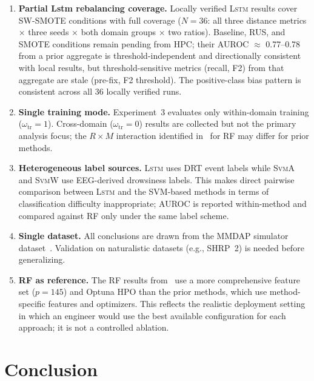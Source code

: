 \documentclass[lettersize,journal]{IEEEtran}
\newcommand{\Impl}[1]{\textsc{#1}}
\begin{document}
\begin{enumerate}
\item \textbf{Partial Lstm rebalancing coverage.} Locally verified \Impl{Lstm} results cover SW-SMOTE conditions with full coverage ($N{=}36$: all three distance metrics $\times$ three seeds $\times$ both domain groups $\times$ two ratios). Baseline, RUS, and SMOTE conditions remain pending from HPC; their AUROC $\approx$ 0.77--0.78 from a prior aggregate is threshold-independent and directionally consistent with local results, but threshold-sensitive metrics (recall, F2) from that aggregate are stale (pre-fix, F2 threshold). The positive-class bias pattern is consistent across all 36 locally verified runs.

\item \textbf{Single training mode.} Experiment~3 evaluates only within-domain training ($\omega_{\mathrm{tr}} = 1$). Cross-domain ($\omega_{\mathrm{tr}} = 0$) results are collected but not the primary analysis focus; the $R \times M$ interaction identified in~\cite{nakagama2026tiv} for RF may differ for prior methods.

\item \textbf{Heterogeneous label sources.} \Impl{Lstm} uses DRT event labels while \Impl{SvmA} and \Impl{SvmW} use EEG-derived drowsiness labels. This makes direct pairwise comparison between \Impl{Lstm} and the SVM-based methods in terms of classification difficulty inappropriate; AUROC is reported within-method and compared against RF only under the same label scheme.

\item \textbf{Single dataset.} All conclusions are drawn from the MMDAP simulator dataset~\cite{aygun2024}. Validation on naturalistic datasets (e.g., SHRP~2) is needed before generalizing.

\item \textbf{RF as reference.} The RF results from~\cite{nakagama2026tiv} use a more comprehensive feature set ($p = 145$) and Optuna HPO than the prior methods, which use method-specific features and optimizers. This reflects the realistic deployment setting in which an engineer would use the best available configuration for each approach; it is not a controlled ablation.
\end{enumerate}

\section{Conclusion}
\label{sec:conclusion}
\end{document}
